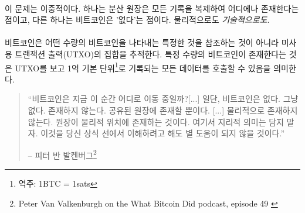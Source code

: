 \paragraph{}
이 문제는 이중적이다. 하나는 분산 원장은 모든 기록을 복제하여 어디에나 존재한다는 점이고, 다른 하나는 비트코인은 '없다'는 점이다. 
물리적으로도 \textit{기술적으로도}.

\paragraph{}
비트코인은 어떤 수량의 비트코인을 나타내는 특정한 것을 참조하는 것이 아니라 미사용 트랜잭션 출력(UTXO)의 집합을 추적한다.
특정 수량의 비트코인이 존재한다는 것은 UTXO를 보고 1억 기본 단위\footnote{역주: 1BTC = 1sats}로 기록되는 모든 데이터를 호출할 수 있음을 의미한다. 

\begin{quotation}\begin{samepage}
		\enquote{비트코인은 지금 이 순간 어디로 이동 중일까?[...] 일단, 비트코인은
			없다. 그냥 없다. 존재하지 않는다. 공유된 원장에 존재할 뿐이다. [...] 
			물리적으로 존재하지 않는다. 원장이 물리적 위치에 존재하는 것이다.
			여기서 지리적 의미는 담지 말자. 이것을 당신 상식 선에서 이해하려고 해도 별 도움이 되지 않을 것이다.}
		\begin{flushright} -- 피터 반 발켄버그\footnote{Peter Van Valkenburgh on the What Bitcoin Did podcast, episode 49 \cite{wbd049}}
\end{flushright}\end{samepage}\end{quotation}

